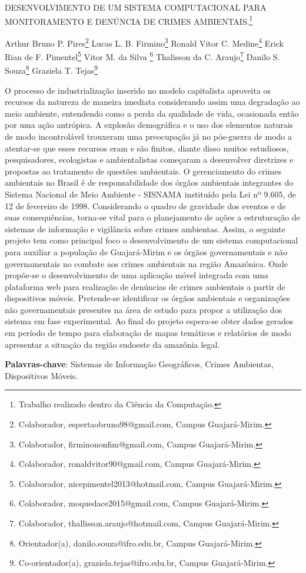 \documentclass[article,12pt,onesidea,4paper,english,brazil]{abntex2}
\begin{document}
	
	
	\frenchspacing 
	
	\begin{center}
		\LARGE DESENVOLVIMENTO DE UM SISTEMA COMPUTACIONAL PARA
		MONITORAMENTO E DENÚNCIA DE CRIMES AMBIENTAIS.\footnote{Trabalho realizado dentro da Ciência da Computação.}
		
		\normalsize
		Arthur Bruno P. Pires\footnote{Colaborador, espertaobruno98@gmail.com, Campus Guajará-Mirim.} 
	Lucas L. B. Firmino\footnote{Colaborador, firminononfim@gmail.com, Campus Guajará-Mirim.} 
		Ronald Vitor C. Medine\footnote{Colaborador, ronaldvitor90@gmail.com, Campus Guajará-Mirim.} 
		Erick Rian de F. Pimentel\footnote{Colaborador, nicepimentel2013@hotmail.com, Campus Guajará-Mirim.} 
		Vitor M. da Silva \footnote{Colaborador, moquedace2015@gmail.com, Campus Guajará-Mirim.}
		Thalisson da C. Araujo\footnote{Colaborador, thallisson.araujo@hotmail.com, Campus Guajará-Mirim.}
		Danilo S. Souza\footnote{Orientador(a), danilo.souza@ifro.edu.br, Campus Guajará-Mirim.}
		Graziela T. Tejas\footnote{Co-orientador(a), graziela.tejas@ifro.edu.br, Campus Guajará-Mirim.}
		
		
		
	\end{center}
	
	\noindent O processo de industrialização inserido no modelo capitalista aproveita os
	recursos da natureza de maneira imediata considerando assim uma degradação
	ao meio ambiente, entendendo como a perda da qualidade de vida, ocasionada
	então por uma ação antrópica. A explosão demográfica e o uso dos elementos
	naturais de modo incontrolável trouxeram uma preocupação já no pós-guerra de
	modo a atentar-se que esses recursos eram e são finitos, diante disso muitos
	estudiosos, pesquisadores, ecologistas e ambientalistas começaram a
	desenvolver diretrizes e propostas ao tratamento de questões ambientais. O
	gerenciamento do crimes ambientais no Brasil é de responsabilidade dos órgãos
	ambientais integrantes do Sistema Nacional de Meio Ambiente - SISNAMA
	instituído pela Lei nº 9.605, de 12 de fevereiro de 1998. Considerando o quadro
	de gravidade dos eventos e de suas consequências, torna-se vital para o
	planejamento de ações a estruturação de sistemas de informação e vigilância
	sobre crimes ambientas. Assim, o seguinte projeto tem como principal foco o
	desenvolvimento de um sistema computacional para auxiliar a população de
	Guajará-Mirim e os órgãos governamentais e não governamentais no combate
	aos crimes ambientais na região Amazônica. Onde propõe-se o desenvolvimento
	de uma aplicação móvel integrada com uma plataforma web para realização de
	denúncias de crimes ambientais a partir de dispositivos móveis. Pretende-se
	identificar os órgãos ambientais e organizações não governamentais presentes
	na área de estudo para propor a utilização dos sistema em fase experimental. Ao
	final do projeto espera-se obter dados gerados em período de tempo para
	elaboração de mapas temáticos e relatórios de modo apresentar a situação da
	região sudoeste da amazônia legal.
	
	\vspace{\onelineskip}
	
	\noindent
	\textbf{Palavras-chave}: Sistemas de Informação Geográficos, Crimes Ambientas,
	Dispositivos Móveis.
	
\end{document}
